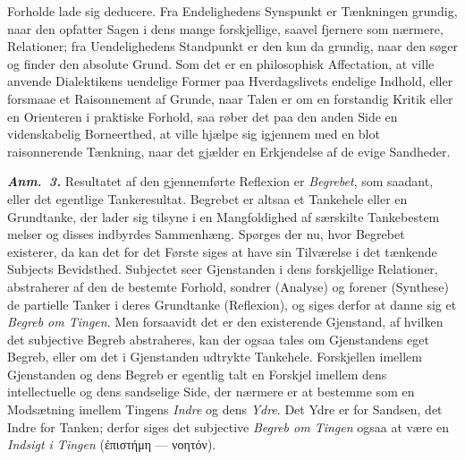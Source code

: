 \documentclass[12pt]{book}
\newcommand{\anm}[1]{\emph{\textbf{Anm.~#1.}}}
\newcommand{\opage}[1]{\marginnote{\footnotesize\textit{[#1]}}}
\begin{document}
\begin{itemize}
  Forholde lade sig deducere. Fra Endelighedens Synspunkt er Tænkningen
  grundig, naar den opfatter Sagen i dens mange forskjellige, saavel fjernere
  som nærmere, Relationer; fra Uendelighedens Standpunkt er den kun da
  grundig, naar den søger og finder den absolute Grund. Som det er en
  philosophisk Affectation, at ville anvende Dialektikens uendelige Former paa
  Hverdagslivets endelige Indhold, eller forsmaae et Raisonnement af Grunde,
  naar Talen er om en forstandig Kritik eller en Orienteren i praktiske
  Forhold, saa røber det paa den anden Side en videnskabelig Borneerthed, at
  ville hjælpe sig igjennem med en blot raisonnerende Tænkning, naar det
  gjælder en Erkjendelse af de evige Sandheder.
\end{itemize}

\anm{3} Resultatet af den gjennemførte Reflexion er \emph{Begrebet}, som
saadant, eller det egentlige Tankeresultat. Begrebet er altsaa et Tankehele
eller en Grundtanke, der lader sig tilsyne i en Mangfoldighed af særskilte
Tankebestem%
\opage{17}melser og disses indbyrdes Sammenhæng. Spørges der nu, hvor Begrebet
existerer, da kan det for det Første siges at have sin Tilværelse i det
tænkende Subjects Bevidsthed. Subjectet seer Gjenstanden i dens forskjellige
Relationer, abstraherer af den de bestemte Forhold, sondrer (Analyse) og
forener (Synthese) de partielle Tanker i deres Grundtanke (Reflexion), og
siges derfor at danne sig et \emph{Begreb om Tingen}. Men forsaavidt det er
den existerende Gjenstand, af hvilken det subjective Begreb abstraheres, kan
der ogsaa tales om Gjenstandens eget Begreb, eller om det i Gjenstanden
udtrykte Tankehele. Forskjellen imellem Gjenstanden og dens Begreb er egentlig
talt en Forskjel imellem dens intellectuelle og dens sandselige Side, der
nærmere er at bestemme som en Modsætning imellem Tingens \emph{Indre} og dens
\emph{Ydre}. Det Ydre er for Sandsen, det Indre for Tanken; derfor siges det
subjective \emph{Begreb om Tingen} ogsaa at være en \emph{Indsigt i Tingen}
(ἐπιστήμη --- νοητόν).
\end{document}
